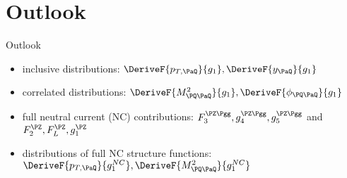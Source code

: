 \section{Outlook}
\begin{frame}{Outlook}
\begin{itemize}
\item inclusive distributions: $\DeriveF{{p_{T,\PaQ}}}{g_1},\DeriveF{{y_{\PaQ}}}{g_1}$
\item correlated distributions: $\DeriveF{{M_{\PQ\PaQ}^2}}{g_1}, \DeriveF{\phi_{\PQ\PaQ}}{g_1}$
\item full neutral current (NC) contributions: $F_3^{\PZ\Pgg}, g_4^{\PZ\Pgg}, g_5^{\PZ\Pgg}$ and $F_2^{\PZ}, F_L^{\PZ}, g_1^{\PZ}$
\item distributions of full NC structure functions: $\DeriveF{p_{T,\PaQ}}{g_1^{NC}},\DeriveF{{M_{\PQ\PaQ}^2}}{g_1^{NC}}$
\end{itemize}
\end{frame}
